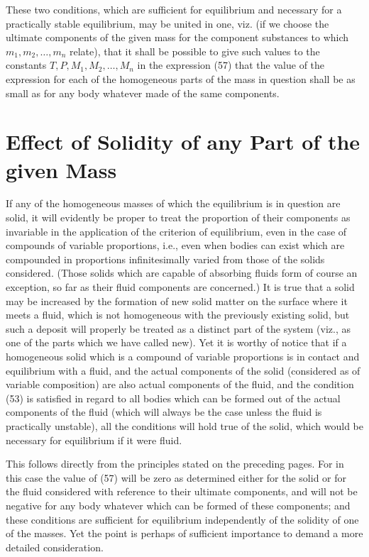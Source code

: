 \documentclass[11pt]{article}
\begin{document}
These two conditions, which are sufficient for equilibrium and necessary for a practically stable equilibrium, may be united in one, viz. (if we choose the ultimate components of the given mass for the component substances to which \(m_1,m_2,\ldots,m_n\) relate), that it shall be possible to give such values to the constants \(T,P,M_1,M_2,\ldots,M_n\) in the expression (57) that the value of the expression for each of the homogeneous parts of the mass in question shall be as small as for any body whatever made of the same components.

\section*{Effect of Solidity of any Part of the given Mass}

If any of the homogeneous masses of which the equilibrium is in question are solid, it will evidently be proper to treat the proportion of their components as invariable in the application of the criterion of equilibrium, even in the case of compounds of variable proportions, i.e., even when bodies can exist which are compounded in proportions infinitesimally varied from those of the solids considered. (Those solids which are capable of absorbing fluids form of course an exception, so far as their fluid components are concerned.) It is true that a solid may be increased by the formation of new solid matter on the surface where it meets a fluid, which is not homogeneous with the previously existing solid, but such a deposit will properly be treated as a distinct part of the system (viz., as one of the parts which we have called new). Yet it is worthy of notice that if a homogeneous solid which is a compound of variable proportions is in contact and equilibrium with a fluid, and the actual components of the solid (considered as of variable composition) are also actual components of the fluid, and the condition (53) is satisfied in regard to all bodies which can be formed out of the actual components of the fluid (which will always be the case unless the fluid is practically unstable), all the conditions will hold true of the solid, which would be necessary for equilibrium if it were fluid.

This follows directly from the principles stated on the preceding pages. For in this case the value of (57) will be zero as determined either for the solid or for the fluid considered with reference to their ultimate components, and will not be negative for any body whatever which can be formed of these components; and these conditions are sufficient for equilibrium independently of the solidity of one of the masses. Yet the point is perhaps of sufficient importance to demand a more detailed consideration.
\end{document}
